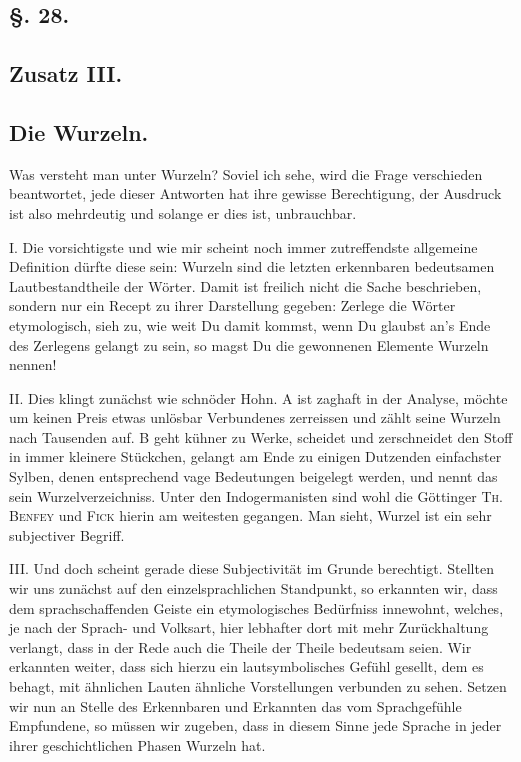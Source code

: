 {\label{sp.295}

\clearpage{}
\subsection*{§. 28.}\label{III.II.II.28}
\subsection*{Zusatz III.}
\subsection*{Die Wurzeln.}
Was versteht man unter Wurzeln? Soviel ich sehe, wird die Frage verschieden beantwortet, jede dieser Antworten hat ihre gewisse Berechtigung, der Ausdruck ist also mehrdeutig und solange er dies ist, unbrauchbar.

I. Die vorsichtigste und wie mir scheint noch immer zutreffendste allgemeine Definition dürfte diese sein: Wurzeln sind die letzten erkennbaren bedeutsamen Lautbestandtheile der Wörter. Damit ist freilich nicht die Sache beschrieben, sondern nur ein Recept zu ihrer Darstellung gegeben: Zerlege die Wörter etymologisch, sieh zu, wie weit Du damit kommst,  wenn Du glaubst an’s Ende des Zerlegens gelangt zu sein, so magst Du die gewonnenen Elemente Wurzeln nennen!

II. Dies klingt zunächst wie schnöder Hohn. A ist zaghaft in der Analyse, möchte um keinen Preis etwas unlösbar Verbundenes zerreissen und zählt seine Wurzeln nach Tausenden auf. B geht kühner zu Werke, scheidet und zerschneidet den Stoff in immer kleinere Stückchen, gelangt am Ende zu einigen Dutzenden einfachster Sylben, denen entsprechend vage Bedeutungen beigelegt werden, und nennt das sein Wurzelverzeichniss. Unter den Indogermanisten sind wohl die Göttinger \textsc{Th. Benfey} und \textsc{Fick} hierin am weitesten gegangen. Man sieht, Wurzel ist ein sehr subjectiver Begriff.

III. Und doch scheint gerade diese Subjectivität im Grunde berechtigt. Stellten wir uns zunächst auf den einzelsprachlichen Standpunkt, so erkannten wir, dass dem sprachschaffenden Geiste ein etymologisches Bedürfniss innewohnt, welches, je nach der Sprach- und Volksart, hier lebhafter dort mit mehr Zurückhaltung verlangt, dass in der Rede auch die Theile der Theile bedeutsam seien. Wir erkannten weiter, dass sich hierzu ein lautsymbolisches Gefühl gesellt, dem es behagt, mit ähnlichen Lauten ähnliche Vorstellungen verbunden zu sehen. Setzen wir nun an Stelle des Erkennbaren und Erkannten das vom Sprachgefühle Empfundene, \label{fp.290} so müssen wir zugeben, dass in diesem Sinne jede Sprache in jeder ihrer geschichtlichen Phasen Wurzeln hat.

}
